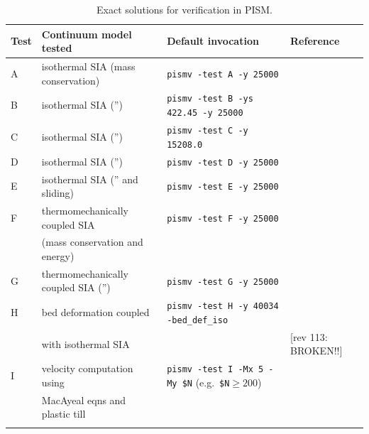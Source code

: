 \documentclass[12pt,final]{amsart}
\begin{document}
\begin{table}[h]
\caption{Exact solutions for verification in PISM.}\label{tab:tests}
\small
\begin{tabular}{@{}llll}\hline
\textbf{Test} & \textbf{Continuum model tested} & \textbf{Default invocation} & \textbf{Reference} \\ \hline
A & isothermal SIA (mass conservation) & \verb|pismv -test A -y 25000| & \cite{BLKCB} \\
B & isothermal SIA ('') & \verb|pismv -test B -ys 422.45 -y 25000| & \cite{BLKCB} \\
C & isothermal SIA ('') & \verb|pismv -test C -y 15208.0| & \cite{BLKCB} \\
D & isothermal SIA ('') & \verb|pismv -test D -y 25000| & \cite{BLKCB} \\
E & isothermal SIA ('' and sliding) & \verb|pismv -test E -y 25000| & \cite{BLKCB} \\
F & thermomechanically coupled SIA  & \verb|pismv -test F -y 25000| & \cite{BBL,BB} \\
 & \quad (mass conservation and energy) & & \\
G & thermomechanically coupled SIA ('') & \verb|pismv -test G -y 25000| & \cite{BBL,BB} \\
H & bed deformation coupled & \verb|pismv -test H -y 40034 -bed_def_iso| & \cite{BLKfastearth} \\
 & \quad with isothermal SIA & & [rev 113: BROKEN!!] \\
I & velocity computation using & \verb|pismv -test I -Mx 5 -My $N| \quad (e.g.~\verb|$N|$\ge 200$) & \cite{MacAyeal,SchoofStream} \\
 & \quad MacAyeal eqns and plastic till & & \\
\hline
\normalsize
\end{tabular}
\end{table}
\end{document}
